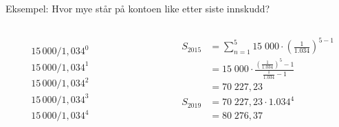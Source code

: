 \begin{frame}[t]{Eksempel: Hvor mye står på kontoen like etter siste innskudd?}
\begin{center}
\end{center}
\begin{columns}[T,onlytextwidth]
  \begin{column}{0.10\textwidth}
    \begin{align*}
      &\\
      &\\
      &15\,000 / 1,034^0\\
      &15\,000 / 1,034^1\\
      &15\,000 / 1,034^2\\
      &15\,000 / 1,034^3\\
      &15\,000 / 1,034^4
    \end{align*}
  \end{column}
  \begin{column}{0.30\textwidth}
  \end{column}
   \begin{column}{0.60\textwidth}
   \begin{align*}
     S_{2015}&=\sum_{n=1}^5 15\;000\cdot \left(\frac{1}{1.034}\right)^{5-1}\\
             &=15\;000\cdot \frac{\left(\frac{1}{1.034}\right)^5-1}{\frac{1}{1.034}-1}\\
             &=70\;227,23\\
     S_{2019}&=70\;227,23\cdot 1.034^4\\
             &=80\;276,37
   \end{align*}
\end{column}
\end{columns}
\end{frame}

